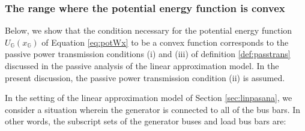 \documentclass[tombow,dvipdfmx]{corona-a5-1.1}
\begin{document}
%
%

\smallskip
\subsubsection{The range where the potential energy function is convex}

Below, we show that the condition necessary for the potential energy function $U_{\mathds{G}}(x_{\mathds{G}})$ of Equation \ref{eq:potWx} to be a convex function corresponds to the passive power transmission conditions (i) and (iii) of definition \ref{def:passtrans} discussed in the passive analysis of the linear approximation model.
In the present discussion, the passive power transmission condition (ii) is assumed.

In the setting of the linear approximation model of Section \ref{sec:linpasana}, we consider a situation wherein the generator is connected to all of the bus bars.
In other words, the subscript sets of the generator buses and load bus bars are:
\end{document}
